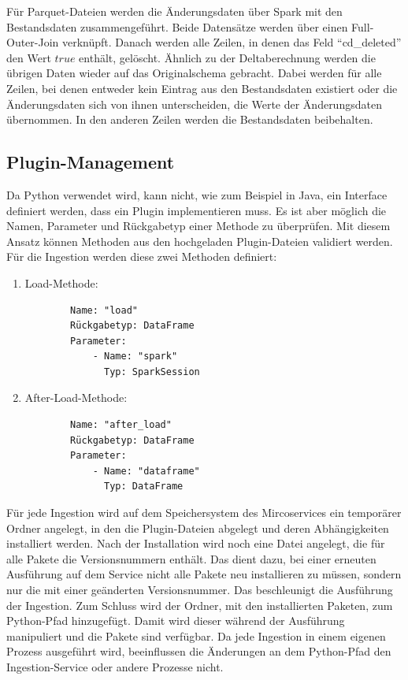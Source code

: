 Für Parquet-Dateien werden die Änderungsdaten über Spark mit den Bestandsdaten zusammengeführt.
Beide Datensätze werden über einen Full-Outer-Join verknüpft.
Danach werden alle Zeilen, in denen das Feld "`cd\_deleted"' den Wert $true$ enthält, gelöscht.
Ähnlich zu der Deltaberechnung werden die übrigen Daten wieder auf das Originalschema gebracht.
Dabei werden für alle Zeilen, bei denen entweder kein Eintrag aus den Bestandsdaten existiert oder die Änderungsdaten sich von ihnen unterscheiden, die Werte der Änderungsdaten übernommen.
In den anderen Zeilen werden die Bestandsdaten beibehalten.

\subsection{Plugin-Management}

Da Python verwendet wird, kann nicht, wie zum Beispiel in Java, ein Interface definiert werden, dass ein Plugin implementieren muss.
Es ist aber möglich die Namen, Parameter und Rückgabetyp einer Methode zu überprüfen.
Mit diesem Ansatz können Methoden aus den hochgeladen Plugin-Dateien validiert werden.
Für die Ingestion werden diese zwei Methoden definiert: \begin{enumerate}
    \item Load-Methode: \begin{verbatim}
        Name: "load"
        Rückgabetyp: DataFrame
        Parameter:
            - Name: "spark"
              Typ: SparkSession
    \end{verbatim}
    \item After-Load-Methode: \begin{verbatim}
        Name: "after_load"
        Rückgabetyp: DataFrame
        Parameter:
            - Name: "dataframe"
              Typ: DataFrame
    \end{verbatim}
\end{enumerate}

Für jede Ingestion wird auf dem Speichersystem des Mircoservices ein temporärer Ordner angelegt, in den die Plugin-Dateien abgelegt und deren Abhängigkeiten installiert werden.
Nach der Installation wird noch eine Datei angelegt, die für alle Pakete die Versionsnummern enthält.
Das dient dazu, bei einer erneuten Ausführung auf dem Service nicht alle Pakete neu installieren zu müssen, sondern nur die mit einer geänderten Versionsnummer.
Das beschleunigt die Ausführung der Ingestion.
Zum Schluss wird der Ordner, mit den installierten Paketen, zum Python-Pfad hinzugefügt.
Damit wird dieser während der Ausführung manipuliert und die Pakete sind verfügbar.
Da jede Ingestion in einem eigenen Prozess ausgeführt wird, beeinflussen die Änderungen an dem Python-Pfad den Ingestion-Service oder andere Prozesse nicht.

